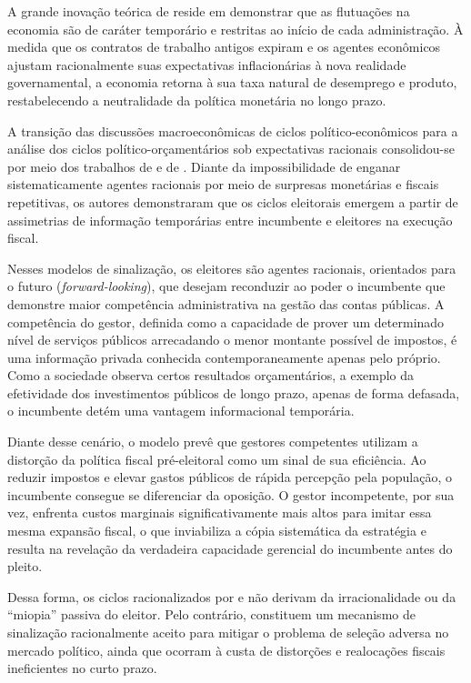 A grande inovação teórica de \textcite{alesina1987} reside em demonstrar que as flutuações na economia são de caráter temporário e restritas ao início de cada administração. À medida que os contratos de trabalho antigos expiram e os agentes econômicos ajustam racionalmente suas expectativas inflacionárias à nova realidade governamental, a economia retorna à sua taxa natural de desemprego e produto, restabelecendo a neutralidade da política monetária no longo prazo.

A transição das discussões macroeconômicas de ciclos político-econômicos para a análise dos ciclos político-orçamentários sob expectativas racionais consolidou-se por meio dos trabalhos de \textcite{rogoff1988} e de \textcite{rogoff1990}. Diante da impossibilidade de enganar sistematicamente agentes racionais por meio de surpresas monetárias e fiscais repetitivas, os autores demonstraram que os ciclos eleitorais emergem a partir de assimetrias de informação temporárias entre incumbente e eleitores na execução fiscal.

Nesses modelos de sinalização, os eleitores são agentes racionais, orientados para o futuro (\textit{forward-looking}), que desejam reconduzir ao poder o incumbente que demonstre maior competência administrativa na gestão das contas públicas. A competência do gestor, definida como a capacidade de prover um determinado nível de serviços públicos arrecadando o menor montante possível de impostos, é uma informação privada conhecida contemporaneamente apenas pelo próprio. Como a sociedade observa certos resultados orçamentários, a exemplo da efetividade dos investimentos públicos de longo prazo, apenas de forma defasada, o incumbente detém uma vantagem informacional temporária.

Diante desse cenário, o modelo prevê que gestores competentes utilizam a distorção da política fiscal pré-eleitoral como um sinal de sua eficiência. Ao reduzir impostos e elevar gastos públicos de rápida percepção pela população, o incumbente consegue se diferenciar da oposição. O gestor incompetente, por sua vez, enfrenta custos marginais significativamente mais altos para imitar essa mesma expansão fiscal, o que inviabiliza a cópia sistemática da estratégia e resulta na revelação da verdadeira capacidade gerencial do incumbente antes do pleito.

Dessa forma, os ciclos racionalizados por \textcite{rogoff1988} e \textcite{rogoff1990} não derivam da irracionalidade ou da ``miopia'' passiva do eleitor. Pelo contrário, constituem um mecanismo de sinalização racionalmente aceito para mitigar o problema de seleção adversa no mercado político, ainda que ocorram à custa de distorções e realocações fiscais ineficientes no curto prazo.

